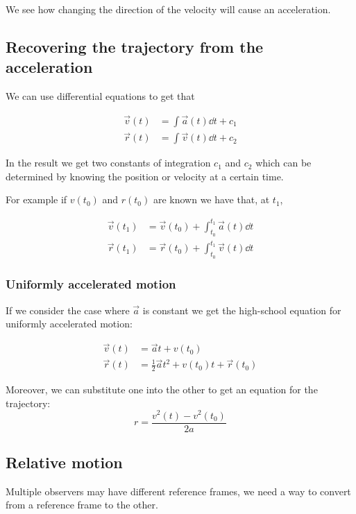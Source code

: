 \documentclass[10pt]{extarticle}
\begin{document}
We see how changing the direction of the velocity will cause an acceleration.

\subsection{Recovering the trajectory from the acceleration}

We can use differential equations to get that

\begin{align*}
  \vec{v}(t) & = \int \vec{a}(t) \dd{t} + c_1 \\
  \vec{r}(t) & = \int \vec{v}(t) \dd{t} + c_2
\end{align*}

In the result we get two constants of integration $c_1$ and $c_2$
which can be determined by knowing the position or velocity at a certain time.

For example if $v(t_0)$ and $r(t_0)$ are known we have that, at $t_1$,

\begin{align*}
  \vec{v}(t_1) & = \vec{v}(t_0) + \int_{t_0}^{t_1} \vec{a}(t) \dd{t} \\
  \vec{r}(t_1) & = \vec{r}(t_0) + \int_{t_0}^{t_1} \vec{v}(t) \dd{t}
\end{align*}

\subsubsection{Uniformly accelerated motion}

If we consider the case where $\vec{a}$ is constant we get
the high-school equation for uniformly accelerated motion:

\begin{align*}
  \vec{v}(t) & = \vec{a} t + v(t_0)                                \\
  \vec{r}(t) & = \frac{1}{2} \vec{a} t^2 + v(t_0) t + \vec{r}(t_0)
\end{align*}

Moreover, we can substitute one into the other to get an equation for the trajectory:
$$
  r = \frac{v^2(t) - v^2(t_0)}{2a}
$$

\subsection{Relative motion}

Multiple observers may have different reference frames,
we need a way to convert from a reference frame to the other.
\end{document}

